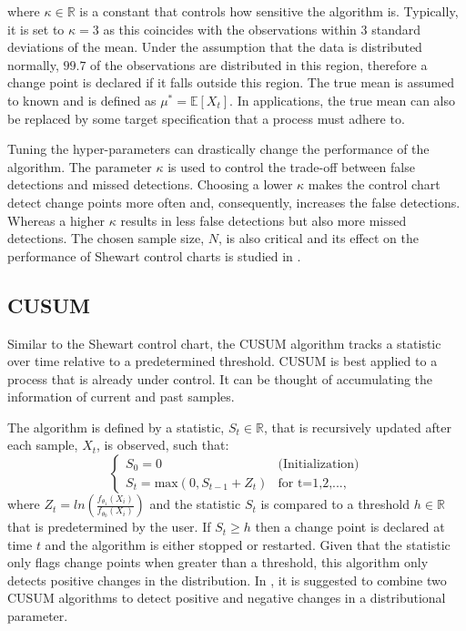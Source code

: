 where $\kappa \in \mathbb{R}$ is a constant that controls how sensitive the algorithm is. Typically, it is set to $\kappa=3$ as this coincides with the observations within $3$ standard deviations of the mean. Under the assumption that the data is distributed normally, $99.7$ of the observations are distributed in this region, therefore a change point is declared if it falls outside this region. The true mean is assumed to known and is defined as $\mu^* = \mathbb{E}[X_t]$. In applications, the true mean can also be replaced by some target specification that a process must adhere to.

Tuning the hyper-parameters can drastically change the performance of the algorithm. The parameter $\kappa$ is used to control the trade-off between false detections and missed detections. Choosing a lower $\kappa$ makes the control chart detect change points more often and, consequently, increases the false detections. Whereas a higher $\kappa$ results in less false detections but also more missed detections. The chosen sample size, $N$, is also critical and its effect on the performance of Shewart control charts is studied in \cite{haridy2017effect}.

\subsection{CUSUM}
Similar to the Shewart control chart, the CUSUM algorithm tracks a statistic over time relative to a predetermined threshold. CUSUM is best applied to a process that is already under control. It can be thought of accumulating the information of current and past samples. 

The algorithm is defined by a statistic, $S_t \in \mathbb{R}$, that is recursively updated after each sample, $X_t$, is observed, such that:
\begin{equation}
  \begin{cases}
    S_0 = 0  & \text{(Initialization)} \\
    S_t = \text{max}(0, S_{t-1} + Z_t) & \text{for t=1,2,...,}
  \end{cases}
\end{equation}
where $Z_t=ln(\frac{f_{\theta_1}(X_i)}{f_{\theta_0}(X_i)})$ and the statistic $S_t$ is compared to a threshold $h \in \mathbb{R}$ that is predetermined by the user. If $S_t \geq h$ then a change point is declared at time $t$ and the algorithm is either stopped or restarted. Given that the statistic only flags change points when greater than a threshold, this algorithm only detects positive changes in the distribution. In \cite{page1954continuous}, it is suggested to combine two CUSUM algorithms to detect positive and negative changes in a distributional parameter.

